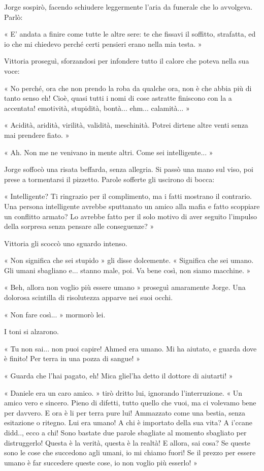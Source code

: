 Jorge sospirò, facendo schiudere leggermente l'aria da funerale che lo avvolgeva. Parlò:

« E' andata a finire come tutte le altre sere: te che fissavi il soffitto, strafatta, ed io che mi chiedevo perché certi pensieri erano nella mia testa. »

Vittoria proseguì, sforzandosi per infondere tutto il calore che poteva nella sua voce:

« No perché, ora che non prendo la roba da qualche ora, non è che abbia più di tanto senso eh! Cioè, quasi tutti i nomi di cose astratte finiscono con la a accentata! emotività, stupidità, bontà... ehm... calamità... »

« Acidità, aridità, virilità, validità, meschinità. Potrei dirtene altre venti senza mai prendere fiato. »

« Ah. Non me ne venivano in mente altri. Come sei intelligente... »

Jorge soffocò una risata beffarda, senza allegria. Si passò una mano sul viso, poi prese a tormentarsi il pizzetto. Parole sofferte gli uscirono di bocca:

« Intelligente? Ti ringrazio per il complimento, ma i fatti mostrano il contrario. Una persona intelligente avrebbe sputtanato un amico alla mafia e fatto scoppiare un conflitto armato? Lo avrebbe fatto per il solo motivo di aver seguito l'impulso della sorpresa senza pensare alle conseguenze? »

Vittoria gli scoccò uno sguardo intenso.

« Non significa che sei stupido » gli disse dolcemente. « Significa che sei umano. Gli umani sbagliano e... stanno male, poi. Va bene così, non siamo macchine. »

« Beh, allora non voglio più essere umano » proseguì amaramente Jorge. Una dolorosa scintilla di risolutezza apparve nei suoi occhi.

« Non fare così... » mormorò lei.

I toni si alzarono.

« Tu non sai... non puoi capire! Ahmed era umano. Mi ha aiutato, e guarda dove è finito! Per terra in una pozza di sangue! »

« Guarda che l'hai pagato, eh! Mica gliel'ha detto il dottore di aiutarti! »

« Daniele era un caro amico. » tirò dritto lui, ignorando l'interruzione. « Un amico vero e sincero. Pieno di difetti, tutto quello che vuoi, ma ci volevamo bene per davvero. E ora è li per terra pure lui! Ammazzato come una bestia, senza esitazione o ritegno. Lui era umano! A chi è importato della sua vita? A i'ccane didd.., ecco a chi! Sono bastate due parole sbagliate al momento sbagliato per distruggerlo! Questa è la verità, questa è la realtà! E allora, sai cosa? Se queste sono le cose che succedono agli umani, io mi chiamo fuori! Se il prezzo per essere umano è far succedere queste cose, io non voglio più esserlo! »

